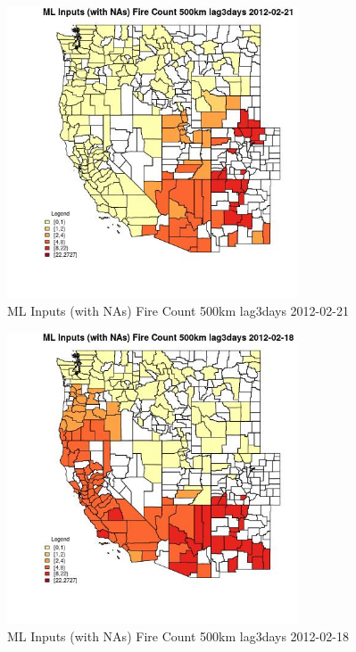 \begin{figure} 
\centering  
\includegraphics[width=0.77\textwidth]{Code_Outputs/Report_ML_input_PM25_Step4_part_f_de_duplicated_aveswNAs_CountyFire_Count_500km_lag3daysMean2012-02-21.jpg} 
\caption{\label{fig:Report_ML_input_PM25_Step4_part_f_de_duplicated_aveswNAsCountyFire_Count_500km_lag3daysMean2012-02-21}ML Inputs (with NAs) Fire Count 500km lag3days 2012-02-21} 
\end{figure} 
 

\begin{figure} 
\centering  
\includegraphics[width=0.77\textwidth]{Code_Outputs/Report_ML_input_PM25_Step4_part_f_de_duplicated_aveswNAs_CountyFire_Count_500km_lag3daysMean2012-02-18.jpg} 
\caption{\label{fig:Report_ML_input_PM25_Step4_part_f_de_duplicated_aveswNAsCountyFire_Count_500km_lag3daysMean2012-02-18}ML Inputs (with NAs) Fire Count 500km lag3days 2012-02-18} 
\end{figure} 
 

